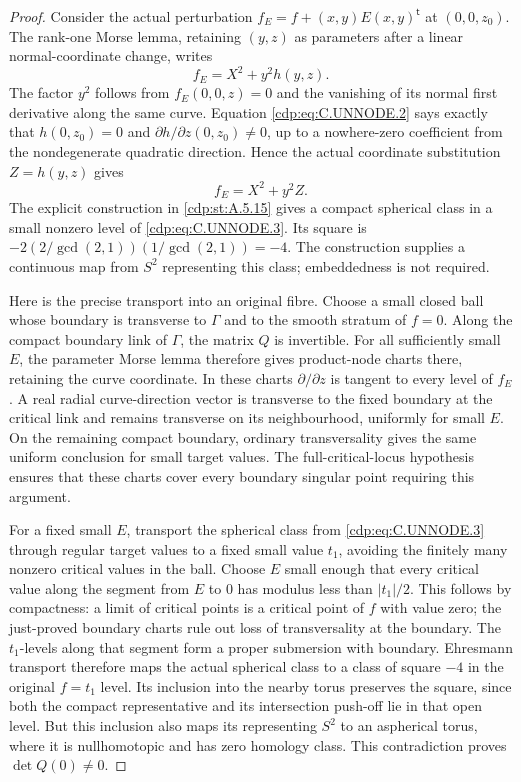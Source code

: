 \begin{proof}
Consider the actual perturbation
$f_E=f+(x,y)E(x,y)^{\mathsf t}$ at $(0,0,z_0)$.
The rank-one Morse lemma, retaining $(y,z)$ as
parameters after a linear normal-coordinate change,
writes
\[
                         f_E=X^2+y^2h(y,z).
\]
The factor $y^2$ follows from $f_E(0,0,z)=0$ and
the vanishing of its normal first derivative along
the same curve. Equation \eqref{cdp:eq:C.UNNODE.2} says exactly
that $h(0,z_0)=0$ and $\partial h/\partial z(0,z_0)
\ne0$, up to a nowhere-zero coefficient from the
nondegenerate quadratic direction. Hence the actual
coordinate substitution $Z=h(y,z)$ gives
\[
                            f_E=X^2+y^2Z.          \tag{C.UNNODE.3}\label{cdp:eq:C.UNNODE.3}
\]
The explicit construction in \ref{cdp:st:A.5.15} gives a compact
spherical class in a small nonzero level of
\eqref{cdp:eq:C.UNNODE.3}. Its square is
$-2(2/\gcd(2,1))(1/\gcd(2,1))=-4$.
The construction supplies a continuous map from
$S^2$ representing this class; embeddedness is
not required.

Here is the precise transport into an original
fibre. Choose a small closed ball whose boundary
is transverse to $\Gamma$ and to the smooth
stratum of $f=0$. Along the compact boundary link
of $\Gamma$, the matrix $Q$ is invertible.
For all sufficiently small $E$, the parameter
Morse lemma therefore gives product-node charts
there, retaining the curve coordinate. In these
charts $\partial/\partial z$ is tangent to every
level of $f_E$. A real radial curve-direction
vector is transverse to the fixed boundary at
the critical link and remains transverse on its
neighbourhood, uniformly for small $E$. On the
remaining compact boundary, ordinary transversality
gives the same uniform conclusion for small target
values. The full-critical-locus hypothesis ensures
that these charts cover every boundary singular
point requiring this argument.

For a fixed small $E$, transport the spherical
class from \eqref{cdp:eq:C.UNNODE.3} through regular target values
to a fixed small value $t_1$, avoiding the finitely
many nonzero critical values in the ball. Choose
$E$ small enough that every critical value along
the segment from $E$ to $0$ has modulus less than
$|t_1|/2$. This follows by compactness: a limit of
critical points is a critical point of $f$ with
value zero; the just-proved boundary charts rule
out loss of transversality at the boundary.
The $t_1$-levels along that segment form a proper
submersion with boundary. Ehresmann transport
therefore maps the actual spherical class to a
class of square $-4$ in the original $f=t_1$ level.
Its inclusion into the nearby torus preserves
the square, since both the compact representative
and its intersection push-off lie in that open
level. But this inclusion also maps its representing
$S^2$ to an aspherical torus, where it is
nullhomotopic and has zero homology class. This
contradiction proves $\det Q(0)\ne0$.


\end{proof}
